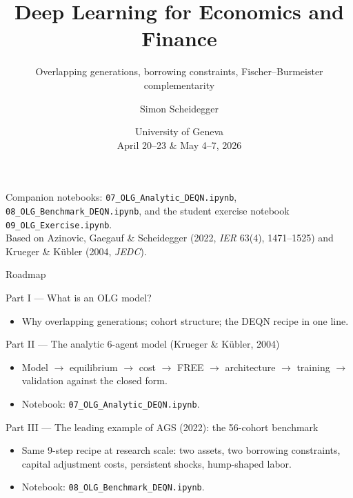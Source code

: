\documentclass[aspectratio=169,11pt]{beamer}
\title[Deep Learning -- Geneva 2026]%
{Deep Learning for Economics and Finance}
\subtitle{Overlapping generations, borrowing constraints, Fischer--Burmeister complementarity}
\author{Simon Scheidegger}
\institute[HEC Lausanne]{HEC, University of Lausanne}
\date{University of Geneva\\April 20--23 \& May 4--7, 2026}
\begin{document}
{
\begin{frame}
\titlepage
\vspace{-0.4cm}
\begin{center}
{\footnotesize Companion notebooks: \texttt{07\_OLG\_Analytic\_DEQN.ipynb}, \texttt{08\_OLG\_Benchmark\_DEQN.ipynb}, and the student exercise notebook \texttt{09\_OLG\_Exercise.ipynb}.}\\[3pt]
{\footnotesize Based on Azinovic, Gaegauf \& Scheidegger (2022, \emph{IER} 63(4), 1471--1525) and Krueger \& K\"ubler (2004, \emph{JEDC}).}
\end{center}
\end{frame}
}

\begin{frame}{Roadmap}
\footnotesize
\begin{block}{Part I --- What is an OLG model?}
\vspace{-3pt}\begin{itemize}\itemsep0pt
    \item Why overlapping generations; cohort structure; the DEQN recipe in one line.
\end{itemize}
\end{block}
\vspace{-2pt}
\begin{block}{Part II --- The analytic 6-agent model (Krueger \& K\"ubler, 2004)}
\vspace{-3pt}\begin{itemize}\itemsep0pt
    \item Model $\to$ equilibrium $\to$ cost $\to$ FREE $\to$ architecture $\to$ training $\to$ validation against the closed form.
    \item Notebook: \texttt{07\_OLG\_Analytic\_DEQN.ipynb}.
\end{itemize}
\end{block}
\vspace{-2pt}
\begin{block}{Part III --- The leading example of AGS (2022): the 56-cohort benchmark}
\vspace{-3pt}\begin{itemize}\itemsep0pt
    \item Same 9-step recipe at research scale: two assets, two borrowing constraints, capital adjustment costs, persistent shocks, hump-shaped labor.
    \item Notebook: \texttt{08\_OLG\_Benchmark\_DEQN.ipynb}.
\end{itemize}
\end{block}
\end{frame}
\end{document}
